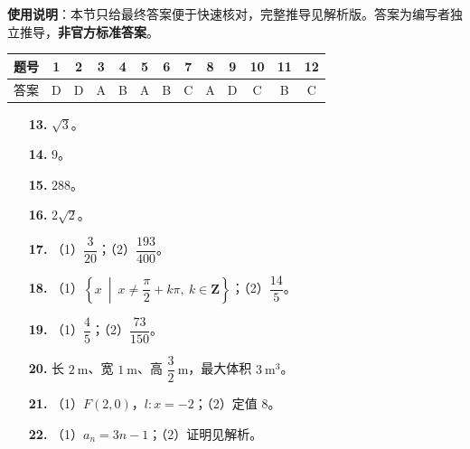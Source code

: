 
\begin{gknotice}
\textbf{使用说明}：本节只给最终答案便于快速核对，完整推导见解析版。答案为编写者独立推导，\textbf{非官方标准答案}。
\end{gknotice}

\begin{center}\begin{tabular}{ccccccccccccc}
\toprule
题号 & 1 & 2 & 3 & 4 & 5 & 6 & 7 & 8 & 9 & 10 & 11 & 12 \\
\midrule
答案 & D & D & A & B & A & B & C & A & D & C & B & C \\
\bottomrule
\end{tabular}\end{center}

\begin{itemize}[leftmargin=2.6em]
  \item[\textbf{13.}] $\sqrt3$。
  \item[\textbf{14.}] $9$。
  \item[\textbf{15.}] $288$。
  \item[\textbf{16.}] $2\sqrt2$。
\end{itemize}

\begin{itemize}[leftmargin=2.6em]
  \item[\textbf{17.}] （1）$\dfrac3{20}$；（2）$\dfrac{193}{400}$。
  \item[\textbf{18.}] （1）$\left\{x\ \middle|\ x\neq\dfrac{\pi}2+k\pi,\ k\in\mathbf Z\right\}$；（2）$\dfrac{14}5$。
  \item[\textbf{19.}] （1）$\dfrac45$；（2）$\dfrac{73}{150}$。
  \item[\textbf{20.}] 长 $2\ \mathrm m$、宽 $1\ \mathrm m$、高 $\dfrac32\ \mathrm m$，最大体积 $3\ \mathrm{m^3}$。
  \item[\textbf{21.}] （1）$F(2,0)$，$l:x=-2$；（2）定值 $8$。
  \item[\textbf{22.}] （1）$a_n=3n-1$；（2）证明见解析。
\end{itemize}
